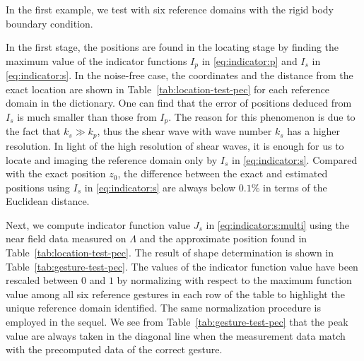 \documentclass[a4paper,11pt]{article}
\theoremstyle{remark}
\theoremstyle{definition}
\numberwithin{equation}{section}
\begin{document}
In the first example, we test with  six reference domains with the rigid body boundary condition.

In the first stage, the positions are found in the locating stage by finding the maximum value of the indicator functions $I_p$ in \eqref{eq:indicator:p} and $I_s$ in \eqref{eq:indicator:s}.
In the noise-free case,   the coordinates and
the distance from the exact location are shown in Table~\ref{tab:location-test-pec} for each reference domain in the dictionary.
One can find that the error of positions deduced from $I_{s}$ is much
smaller than those from $I_{p}$. The reason for this phenomenon is due to the fact that $k_{s}\gg k_{p}$,
thus the shear wave with wave number $k_{s}$ has a higher resolution. In light of the high resolution of shear waves, it is enough for us to locate and imaging the reference domain only
by $I_{s}$ in \eqref{eq:indicator:s}.
Compared with the exact position $z_0$, the difference between the exact and estimated positions using $I_s$ in \eqref{eq:indicator:s} are always below $0.1\%$ in terms of the Euclidean distance.



Next, we compute indicator function value $J_s$ in \eqref{eq:indicator:s:multi} using the near field data measured on $\Lambda$ and the approximate position found in Table~\ref{tab:location-test-pec}.
The result of shape determination is shown in Table~\ref{tab:gesture-test-pec}. The values of the indicator function value have  been
rescaled between $0$ and $1$ by normalizing with respect to the maximum function value among all six reference gestures in each row of the table to highlight the unique reference domain
identified. The same normalization procedure is employed in the sequel. We see from Table~\ref{tab:gesture-test-pec} that the peak value are always taken in the diagonal line
when the measurement data match with the precomputed data of the correct gesture.
\end{document}
